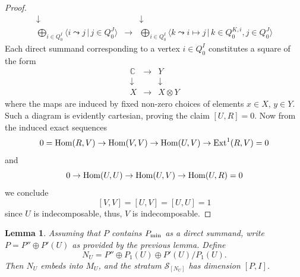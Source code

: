 \documentclass{amsart}
\numberwithin{equation}{section}
\newtheorem{lem}[thm]{Lemma}
\theoremstyle{remark}
\begin{document}
\begin{proof}
$$\begin{array}{ccc}
\downarrow&&\downarrow\\
\bigoplus_{i\in Q_0^I}\langle i\leadsto j\, |\, j\in Q_0^J\rangle&\rightarrow&\bigoplus_{i\in Q_0^I}\langle k\leadsto i\mapsto j\, |\, k\in Q_0^{K,i}, j\in Q_0^J\rangle\end{array}$$
Each direct summand corresponding to a vertex $i\in Q_0^I$ constitutes a square of the form
$$\begin{array}{ccc}\mathbb{C}&\rightarrow&Y\\ \downarrow&&\downarrow\\ X&\rightarrow&X\otimes Y\end{array}$$
where the maps are induced by fixed non-zero choices of elements $x\in X$, $y\in Y$. Such a diagram is evidently cartesian, proving the claim $[U,R]=0$. Now from the induced exact sequences
$$0={\rm Hom}(R,V)\rightarrow{\rm Hom}(V,V)\rightarrow{\rm Hom}(U,V)\rightarrow{\rm Ext}^1(R,V)=0$$
and
$$0\rightarrow{\rm Hom}(U,U)\rightarrow{\rm Hom}(U,V)\rightarrow{\rm Hom}(U,R)=0$$
we conclude
$$[V,V]=[U,V]=[U,U]=1$$
since $U$ is indecomposable, thus, $V$ is indecomposable.
\end{proof}

\begin{lem}\label{lems2} Assuming that $P$ contains $P_{\rm min}$ as a direct summand, write $P=P''\oplus P'(U)$ as provided by the previous lemma. Define 
\begin{equation}\label{eq:NU}
N_U=P''\oplus P_1(U)\oplus P'(U)/P_1(U).    
\end{equation}
Then $N_U$ embeds into $M_U$, and the stratum $\mathcal{S}_{[N_U]}$ has dimension $[P,I]$.
\end{lem}
\end{document}
